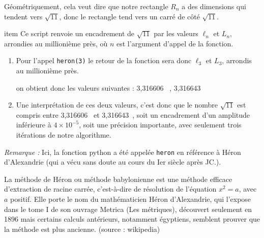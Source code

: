 \documentclass[10pt]{article}
\providecommand{\np}[2][]{{#2~#1}}
\begin{document}
\begin{enumerate}
Géométriquement, cela veut dire que notre rectangle $R_n$ a des dimensions qui tendent vers $\sqrt{11}$, donc le rectangle tend vers un carré de côté $\sqrt{11}$.

item Ce script renvoie un encadrement de $\sqrt{11}$ par les valeurs $\ell_n$ et $L_n$, arrondies au millionième près, où $n$ est l'argument d'appel de la fonction.

	\begin{enumerate}
		\item Pour l'appel \texttt{heron(3)} le retour de la fonction sera donc $\ell_3$ et $L_3$, arrondis au millionième près.

on obtient donc les valeurs suivantes : \np{3,316606} , \np{3,316643}

		\item Une interprétation de ces deux valeurs, c'est donc que le nombre $\sqrt{11}$ est compris entre \np{3,316606} et \np{3,316643}, soit un encadrement d'un amplitude inférieure à $4\times 10^{-5}$, soit une précision importante, avec seulement trois itérations de notre algorithme.
		\end{enumerate}

	\end{enumerate}
\emph{Remarque :} Ici, la fonction python a été appelée \texttt{heron} en référence à Héron d'Alexandrie (qui a vécu sans doute au cours du Ier siècle après JC.).

La méthode de Héron ou méthode babylonienne est une méthode efficace d'extraction de racine carrée, c’est-à-dire de résolution de l'équation $x^2 = a$, avec $a$ positif. Elle porte le nom du mathématicien Héron d'Alexandrie, qui l'expose dans le tome I de son ouvrage Metrica (Les métriques), découvert seulement en 1896 mais certains calculs antérieurs, notamment égyptiens, semblent prouver que la méthode est plus ancienne.
\hfill(source : wikipedia)
\end{document}
